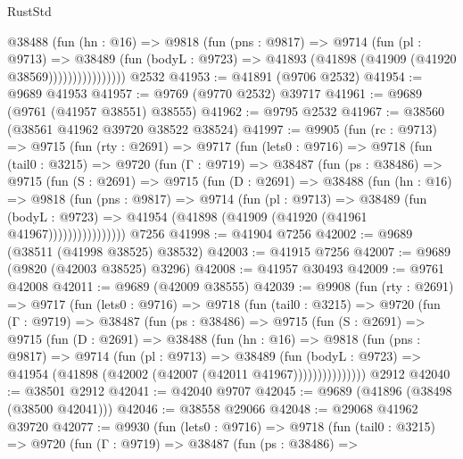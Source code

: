 \begin{lexlean}{RustStd}
\begin{coremodule}
                    @38488
                      (fun (hn : @16) =>
                      @9818
                        (fun (pns : @9817) =>
                        @9714
                          (fun (pl : @9713) =>
                          @38489
                            (fun (bodyL : @9723) =>
                            @41893 (@41898 (@41909 (@41920 @38569))))))))))))))))
    @2532
@41953 := @41891 (@9706 @2532)
@41954 := @9689 @41953
@41957 := @9769 (@9770 @2532) @39717
@41961 := @9689 (@9761 (@41957 @38551) @38555)
@41962 := @9795 @2532
@41967 := @38560 (@38561 @41962 @39720 @38522 @38524)
@41997 := @9905
    (fun (rc : @9713) =>
    @9715
      (fun (rty : @2691) =>
      @9717
        (fun (lets0 : @9716) =>
        @9718
          (fun (tail0 : @3215) =>
          @9720
            (fun (Γ : @9719) =>
            @38487
              (fun (ps : @38486) =>
              @9715
                (fun (S : @2691) =>
                @9715
                  (fun (D : @2691) =>
                  @38488
                    (fun (hn : @16) =>
                    @9818
                      (fun (pns : @9817) =>
                      @9714
                        (fun (pl : @9713) =>
                        @38489
                          (fun (bodyL : @9723) =>
                          @41954 (@41898 (@41909 (@41920 (@41961 @41967))))))))))))))))
    @7256
@41998 := @41904 @7256
@42002 := @9689 (@38511 (@41998 @38525) @38532)
@42003 := @41915 @7256
@42007 := @9689 (@9820 (@42003 @38525) @3296)
@42008 := @41957 @30493
@42009 := @9761 @42008
@42011 := @9689 (@42009 @38555)
@42039 := @9908
    (fun (rty : @2691) =>
    @9717
      (fun (lets0 : @9716) =>
      @9718
        (fun (tail0 : @3215) =>
        @9720
          (fun (Γ : @9719) =>
          @38487
            (fun (ps : @38486) =>
            @9715
              (fun (S : @2691) =>
              @9715
                (fun (D : @2691) =>
                @38488
                  (fun (hn : @16) =>
                  @9818
                    (fun (pns : @9817) =>
                    @9714
                      (fun (pl : @9713) =>
                      @38489
                        (fun (bodyL : @9723) =>
                        @41954 (@41898 (@42002 (@42007 (@42011 @41967)))))))))))))))
    @2912
@42040 := @38501 @2912
@42041 := @42040 @9707
@42045 := @9689 (@41896 (@38498 (@38500 @42041)))
@42046 := @38558 @29066
@42048 := @29068 @41962 @39720
@42077 := @9930
    (fun (lets0 : @9716) =>
    @9718
      (fun (tail0 : @3215) =>
      @9720
        (fun (Γ : @9719) =>
        @38487
          (fun (ps : @38486) =>

\end{coremodule}
\end{lexlean}
